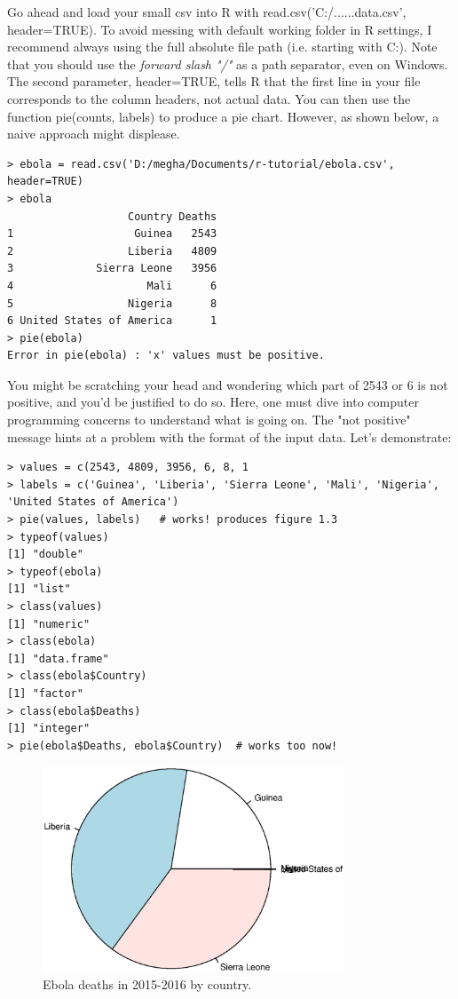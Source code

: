 \documentclass{report}
\newcommand{\code}[1]{\textsf{\ttfamily #1}}
\begin{document}
Go ahead and load your small csv into R with \code{read.csv('C:/......data.csv', header=TRUE)}. To avoid messing with default working folder in R settings, I recommend always using the full absolute file path (i.e. starting with C:). Note that you should use the \emph{forward slash "/"} as a path separator, even on Windows. The second parameter, \code{header=TRUE}, tells R that the first line in your file corresponds to the column headers, not actual data. You can then use the function \code{pie(counts, labels)} to produce a pie chart. However, as shown below, a naive approach might displease.
\begin{verbatim}
> ebola = read.csv('D:/megha/Documents/r-tutorial/ebola.csv', header=TRUE)
> ebola
                   Country Deaths
1                   Guinea   2543
2                  Liberia   4809
3             Sierra Leone   3956
4                     Mali      6
5                  Nigeria      8
6 United States of America      1
> pie(ebola)
Error in pie(ebola) : 'x' values must be positive.
\end{verbatim}

You might be scratching your head and wondering which part of 2543 or 6 is not positive, and you'd be justified to do so. Here, one must dive into computer programming concerns to understand what is going on. The "not positive" message hints at a problem with the format of the input data. Let's demonstrate:
\begin{verbatim}
> values = c(2543, 4809, 3956, 6, 8, 1
> labels = c('Guinea', 'Liberia', 'Sierra Leone', 'Mali', 'Nigeria', 'United States of America')
> pie(values, labels)	# works! produces figure 1.3
> typeof(values)
[1] "double"
> typeof(ebola)
[1] "list"
> class(values)
[1] "numeric"
> class(ebola)
[1] "data.frame"
> class(ebola$Country)
[1] "factor"
> class(ebola$Deaths)
[1] "integer"
> pie(ebola$Deaths, ebola$Country)	# works too now!

\end{verbatim}
\begin{figure}[h]
	\centering
	\includegraphics[width=0.8\textwidth]{pie.eps}
	\caption{Ebola deaths in 2015-2016 by country.}
\label{fig:pie}
\end{figure}
\end{document}
